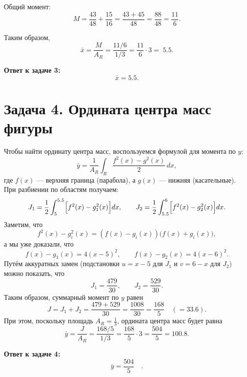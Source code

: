 \documentclass[12pt,a4paper]{article}
\begin{document}
Общий момент:
\[
M=\frac{43}{48}+\frac{15}{16}=\frac{43+45}{48}=\frac{88}{48}=\frac{11}{6}.
\]

Таким образом,
\[
\bar{x}=\frac{M}{A_R}=\frac{11/6}{1/3}=\frac{11}{6}\cdot3=\;5.5.
\]

\textbf{Ответ к задаче 3:} 
\[
\bar{x}=5.5.
\]

\section*{Задача 4. Ордината центра масс фигуры}
Чтобы найти ординату центра масс, воспользуемся формулой для момента по \(y\):
\[
\bar{y}=\frac{1}{A_R}\int_{R}\frac{f^2(x)-g^2(x)}{2}\,dx,
\]
где \(f(x)\) --- верхняя граница (парабола), а \(g(x)\) --- нижняя (касательные). При разбиении по областям получаем:
\[
J_1=\frac{1}{2}\int_{5}^{5.5}\Bigl[f^2(x)-g_1^2(x)\Bigr]dx,\qquad
J_2=\frac{1}{2}\int_{5.5}^{6}\Bigl[f^2(x)-g_2^2(x)\Bigr]dx.
\]
Заметим, что
\[
f^2(x)-g_i^2(x)=(f(x)-g_i(x))\bigl(f(x)+g_i(x)\bigr),
\]
а мы уже доказали, что
\[
f(x)-g_1(x)=4(x-5)^2,\qquad f(x)-g_2(x)=4(x-6)^2.
\]
Путём аккуратных замен (подстановки \(u=x-5\) для \(J_1\) и \(v=6-x\) для \(J_2\)) можно показать, что
\[
J_1=\frac{479}{30},\qquad J_2=\frac{529}{30}.
\]
Таким образом, суммарный момент по \(y\) равен
\[
J=J_1+J_2=\frac{479+529}{30}=\frac{1008}{30}=\frac{168}{5}\quad (=33.6).
\]
При этом, поскольку площадь \(A_R=\frac{1}{3}\), ордината центра масс будет равна
\[
\bar{y}=\frac{J}{A_R}=\frac{168/5}{1/3}=\frac{168}{5}\cdot3=\frac{504}{5}=100.8.
\]

\textbf{Ответ к задаче 4:}
\[
\bar{y}=\frac{504}{5}\quad.
\]
\end{document}
